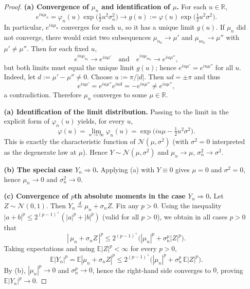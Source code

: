 \documentclass[12pt]{article}
\renewcommand{\(}{\left(}%
\renewcommand{\)}{\right)}%
\renewcommand{\[}{\left[}%
\renewcommand{\]}{\right]}%
\newtheorem{proof}{Proof.}}
\begin{document}
\begin{proof}
\smallskip
\noindent\textbf{(a) Convergence of $\mu_n$ and identification of $\mu$.}
For each $u\in\mathbb R$,
\begin{equation*}
e^{iu\mu_n}
=\varphi_n(u)\exp\!\Big(\tfrac12 u^2\sigma_n^2\Big)
\longrightarrow
g(u):=\varphi(u)\exp\!\Big(\tfrac12 u^2\sigma^2\Big).
\end{equation*}
In particular, $e^{iu\mu_n}$ converges for each $u$, so it has a unique limit $g(u)$.
If $\mu_n$ did not converge, there would exist two subsequences $\mu_{n_k}\to \mu'$ and $\mu_{m_k}\to \mu''$ with $\mu'\neq \mu''$. Then for each fixed $u$,
\begin{equation*}
e^{iu\mu_{n_k}}\to e^{iu\mu'}
\quad\text{and}\quad
e^{iu\mu_{m_k}}\to e^{iu\mu''},
\end{equation*}
but both limits must equal the unique limit $g(u)$; hence $e^{iu\mu'}=e^{iu\mu''}$ for all $u$.
Indeed, let $d:=\mu'-\mu''\neq 0$. Choose $u:=\pi/|d|$. Then $ud=\pm\pi$ and thus
\begin{equation*}
e^{iu\mu'}=e^{iu\mu''}e^{iud}=-e^{iu\mu''}\neq e^{iu\mu''},
\end{equation*}
a contradiction. Therefore $\mu_n$ converges to some $\mu\in\mathbb R$.

\smallskip
\noindent\textbf{(a) Identification of the limit distribution.}
Passing to the limit in the explicit form of $\varphi_n(u)$ yields, for every $u$,
\begin{equation*}
\varphi(u)=\lim_{n\to\infty}\varphi_n(u)
=\exp\!\Big(iu\mu-\tfrac12 u^2\sigma^2\Big).
\end{equation*}
This is exactly the characteristic function of $\mathcal N(\mu,\sigma^2)$ (with $\sigma^2=0$ interpreted as the degenerate law at $\mu$). Hence $Y\sim \mathcal N(\mu,\sigma^2)$ and $\mu_n\to\mu$, $\sigma_n^2\to\sigma^2$.

\smallskip
\noindent\textbf{(b) The special case $Y_n\Rightarrow 0$.}
Applying (a) with $Y\equiv 0$ gives $\mu=0$ and $\sigma^2=0$, hence $\mu_n\to 0$ and $\sigma_n^2\to 0$.

\smallskip
\noindent\textbf{(c) Convergence of $p$th absolute moments in the case $Y_n\Rightarrow 0$.}
Let $Z\sim \mathcal N(0,1)$. Then $Y_n\stackrel{d}{=}\mu_n+\sigma_n Z$.
Fix any $p>0$. Using the inequality $|a+b|^p\le 2^{(p-1)^+}(|a|^p+|b|^p)$ (valid for all $p>0$), we obtain in all cases $p>0$ that
\begin{equation*}
|\,\mu_n+\sigma_n Z\,|^p
\le 2^{(p-1)^+}\big(|\mu_n|^p+\sigma_n^p|Z|^p\big).
\end{equation*}
Taking expectations and using $\mathbb E|Z|^p<\infty$ for every $p>0$,
\begin{equation*}
\mathbb E|Y_n|^p
=\mathbb E|\mu_n+\sigma_n Z|^p
\le 2^{(p-1)^+}\Big(|\mu_n|^p+\sigma_n^p\,\mathbb E|Z|^p\Big).
\end{equation*}
By (b), $|\mu_n|^p\to 0$ and $\sigma_n^p\to 0$, hence the right-hand side converges to $0$, proving $\mathbb E|Y_n|^p\to 0$.
\end{proof}
\end{document}
